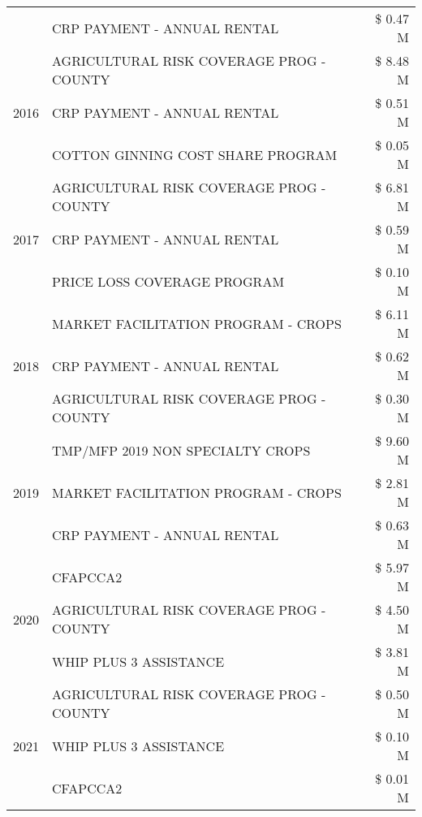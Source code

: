 \begin{tabular}{llr}
 & CRP PAYMENT - ANNUAL RENTAL & \$ 0.47 M \\
\cline{1-3}
\multirow[t]{3}{*}{2016} & AGRICULTURAL RISK COVERAGE PROG - COUNTY & \$ 8.48 M \\
 & CRP PAYMENT - ANNUAL RENTAL & \$ 0.51 M \\
 & COTTON GINNING COST SHARE PROGRAM & \$ 0.05 M \\
\cline{1-3}
\multirow[t]{3}{*}{2017} & AGRICULTURAL RISK COVERAGE PROG - COUNTY & \$ 6.81 M \\
 & CRP PAYMENT - ANNUAL RENTAL & \$ 0.59 M \\
 & PRICE LOSS COVERAGE PROGRAM & \$ 0.10 M \\
\cline{1-3}
\multirow[t]{3}{*}{2018} & MARKET FACILITATION PROGRAM - CROPS & \$ 6.11 M \\
 & CRP PAYMENT - ANNUAL RENTAL & \$ 0.62 M \\
 & AGRICULTURAL RISK COVERAGE PROG - COUNTY & \$ 0.30 M \\
\cline{1-3}
\multirow[t]{3}{*}{2019} & TMP/MFP 2019 NON SPECIALTY CROPS & \$ 9.60 M \\
 & MARKET FACILITATION PROGRAM - CROPS & \$ 2.81 M \\
 & CRP PAYMENT - ANNUAL RENTAL & \$ 0.63 M \\
\cline{1-3}
\multirow[t]{3}{*}{2020} & CFAPCCA2 & \$ 5.97 M \\
 & AGRICULTURAL RISK COVERAGE PROG - COUNTY & \$ 4.50 M \\
 & WHIP PLUS 3 ASSISTANCE & \$ 3.81 M \\
\cline{1-3}
\multirow[t]{3}{*}{2021} & AGRICULTURAL RISK COVERAGE PROG - COUNTY & \$ 0.50 M \\
 & WHIP PLUS 3 ASSISTANCE & \$ 0.10 M \\
 & CFAPCCA2 & \$ 0.01 M \\
\cline{1-3}
\bottomrule
\end{tabular}
